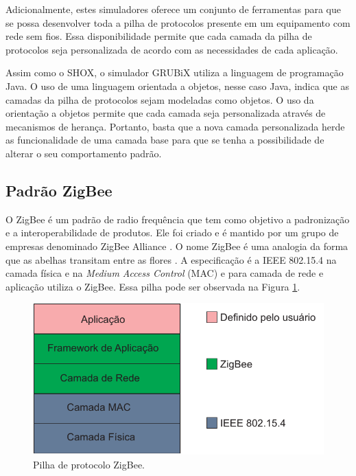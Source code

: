 Adicionalmente, estes simuladores oferece um conjunto de ferramentas para que se possa desenvolver toda a pilha de protocolos presente em um equipamento com rede sem fios. Essa disponibilidade permite que cada camada da pilha de protocolos seja personalizada de acordo com as necessidades de cada aplicação.

Assim como o SHOX, o simulador GRUBiX utiliza a linguagem de programação Java. O uso de uma linguagem orientada a objetos, nesse caso Java, indica que as camadas da pilha de protocolos sejam modeladas como objetos. O uso da orientação a objetos permite que cada camada seja personalizada através de mecanismos de herança. Portanto, basta que a nova camada personalizada herde as funcionalidade de uma camada base para que se tenha a possibilidade de alterar o seu comportamento padrão.

\subsection{Padrão ZigBee}

O ZigBee é um padrão de radio frequência que tem como objetivo a padronização e a interoperabilidade de produtos. Ele foi criado e é mantido por um grupo de empresas denominado ZigBee Alliance \cite{ZigBeeAlliance:2015}. O nome ZigBee é uma analogia da forma que as abelhas transitam entre as flores \cite{Safaric:2006}.
A especificação é a IEEE 802.15.4 na camada física e na \emph{Medium Access Control} (MAC) e para camada de rede e aplicação utiliza o ZigBee. Essa pilha pode ser observada na Figura \ref{fig:pilhaZigbee}.

\begin{figure}[htbp]
	\centering
		\includegraphics[scale=0.6]{referencial/figuras/pilhaZigbee.pdf}
	\caption{Pilha de protocolo ZigBee.}
	\label{fig:pilhaZigbee}
\end{figure}

